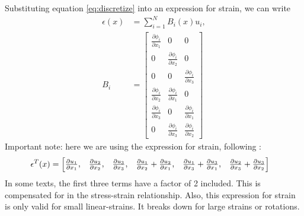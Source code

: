 \documentclass[10pt]{article}
\newcommand{\di}[2]{\frac{\partial#1}{\partial#2}}
\begin{document}
Substituting equation \eqref{eq:discretize} into an expression for strain, we can write
\begin{align}
  \epsilon(x) & = \sum_{i=1}^N B_i(x) u_i,\\
  B_i & = \begin{bmatrix}
	  \di{\phi_i}{x_1} & 0 & 0\\
	  0 & \di{\phi_i}{x_2} & 0\\
	  0 & 0 & \di{\phi_i}{x_3}\\
	  \di{\phi_i}{x_2} & \di{\phi_i}{x_1} & 0\\
	  \di{\phi_i}{x_3} & 0 & \di{\phi_i}{x_1}\\
	  0 & \di{\phi_i}{x_3} & \di{\phi_i}{x_2}
        \end{bmatrix}
\end{align}
Important note: here we are using the expression for strain, following \cite{bonet:2000:fem}:
\begin{align}
  \epsilon^T(x) & = \begin{bmatrix}
                   \di{u_1}{x_1}, &  \di{u_2}{x_2}, & \di{u_3}{x_3}, 
                   & \di{u_1}{x_2}+\di{u_2}{x_1}, & \di{u_1}{x_3}+\di{u_3}{x_1}, 
                   & \di{u_2}{x_3}+\di{u_3}{x_2}
                  \end{bmatrix} \notag
\end{align}
In some texts, the first three terms have a factor of 2 included.  This is compensated
for in the stress-strain relationship.  Also, this expression for strain
is only valid for small linear-strains.  It breaks down for large strains or rotations.
\end{document}
